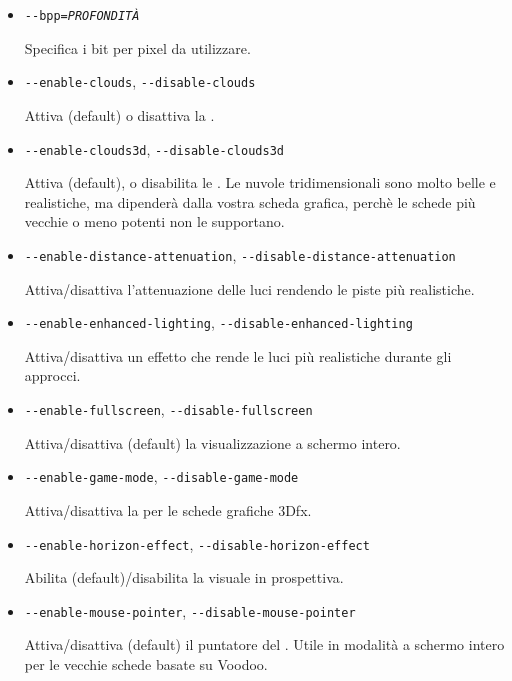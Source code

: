 \begin{itemize}
{\begin{itemize}
  Imposta un moltiplicatore per il rapporto dello schermo.

  \item{\texttt{-$ $-bpp={\it PROFONDIT\`{A}}}}

  Specifica i bit per pixel da utilizzare.

  \item{\texttt{-$ $-enable-clouds}, \texttt{-$ $-disable-clouds}}

  Attiva (default) o disattiva la .

  \item{\texttt{-$ $-enable-clouds3d}, \texttt{-$ $-disable-clouds3d}}

  Attiva (default), o disabilita le . Le nuvole tridimensionali sono
  molto belle e realistiche, ma dipender\`{a} dalla vostra scheda grafica,
  perch\`{e} le schede pi\`{u} vecchie o meno potenti non le supportano.

  \item{\texttt{-$ $-enable-distance-attenuation}, \texttt{-$ $-disable-distance-attenuation}}

  Attiva/disattiva l'attenuazione delle luci rendendo le piste pi\`{u} realistiche.

  \item{\texttt{-$ $-enable-enhanced-lighting}, \texttt{-$ $-disable-enhanced-lighting}}

  Attiva/disattiva un effetto che rende le luci pi\`{u} realistiche durante gli approcci.

  \item{\texttt{-$ $-enable-fullscreen}, \texttt{-$ $-disable-fullscreen}}

  Attiva/disattiva (default) la visualizzazione a schermo intero.

  \item{\texttt{-$ $-enable-game-mode}, \texttt{-$ $-disable-game-mode}}

  Attiva/disattiva la  per le schede grafiche 3Dfx.

  \item{\texttt{-$ $-enable-horizon-effect}, \texttt{-$ $-disable-horizon-effect}}

  Abilita (default)/disabilita la visuale in prospettiva.

  \item{\texttt{-$ $-enable-mouse-pointer}, \texttt{-$ $-disable-mouse-pointer}}

  Attiva/disattiva (default) il puntatore del . Utile in modalit\`{a} a schermo intero per le vecchie schede basate su Voodoo.


\end{itemize}}
\end{itemize}
